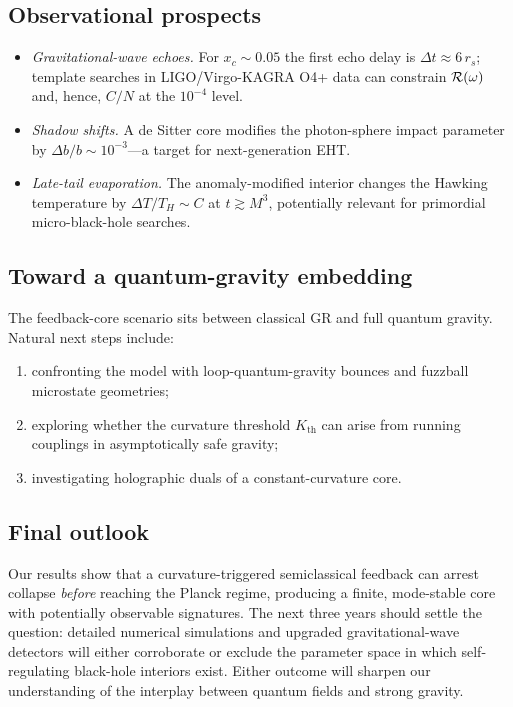 \subsection{Observational prospects}

\begin{itemize}[leftmargin=*]
  \item \emph{Gravitational-wave echoes.} For $x_c\sim0.05$ the first echo delay is $\Delta t\approx6\,r_s$; template searches in LIGO/Virgo-KAGRA O4+ data can constrain ${\cal R}(\omega)$ and, hence, $C/N$ at the $10^{-4}$ level.
  \item \emph{Shadow shifts.} A de Sitter core modifies the photon-sphere impact parameter by $\Delta b/b\sim10^{-3}$—a target for next-generation EHT.
  \item \emph{Late-tail evaporation.} The anomaly-modified interior changes the Hawking temperature by $\Delta T/T_H\sim C$ at $t\gtrsim M^{3}$, potentially relevant for primordial micro-black-hole searches.
\end{itemize}

\subsection{Toward a quantum-gravity embedding}

The feedback-core scenario sits between classical GR and full
quantum gravity.  Natural next steps include:

\begin{enumerate}[leftmargin=*]
  \item confronting the model with loop-quantum-gravity bounces and fuzzball microstate geometries;
  \item exploring whether the curvature threshold \(K_{\mathrm{th}}\) can arise from running couplings in asymptotically safe gravity;
  \item investigating holographic duals of a constant-curvature core.
\end{enumerate}

\subsection{Final outlook}

Our results show that a curvature-triggered semiclassical feedback can arrest collapse \emph{before} reaching the Planck regime, producing a finite, mode-stable core with potentially observable
signatures. The next three years should settle the question: detailed numerical simulations and upgraded gravitational-wave detectors will either corroborate or exclude the parameter space in which
self-regulating black-hole interiors exist.  Either outcome will sharpen our understanding of the interplay between quantum fields and strong gravity.
